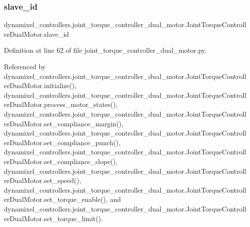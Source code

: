 \subsubsection{\texorpdfstring{slave\+\_\+id}{slave\_id}}
{\footnotesize\ttfamily dynamixel\+\_\+controllers.\+joint\+\_\+torque\+\_\+controller\+\_\+dual\+\_\+motor.\+Joint\+Torque\+Controller\+Dual\+Motor.\+slave\+\_\+id}



Definition at line 62 of file joint\+\_\+torque\+\_\+controller\+\_\+dual\+\_\+motor.\+py.



Referenced by dynamixel\+\_\+controllers.\+joint\+\_\+torque\+\_\+controller\+\_\+dual\+\_\+motor.\+Joint\+Torque\+Controller\+Dual\+Motor.\+initialize(), dynamixel\+\_\+controllers.\+joint\+\_\+torque\+\_\+controller\+\_\+dual\+\_\+motor.\+Joint\+Torque\+Controller\+Dual\+Motor.\+process\+\_\+motor\+\_\+states(), dynamixel\+\_\+controllers.\+joint\+\_\+torque\+\_\+controller\+\_\+dual\+\_\+motor.\+Joint\+Torque\+Controller\+Dual\+Motor.\+set\+\_\+compliance\+\_\+margin(), dynamixel\+\_\+controllers.\+joint\+\_\+torque\+\_\+controller\+\_\+dual\+\_\+motor.\+Joint\+Torque\+Controller\+Dual\+Motor.\+set\+\_\+compliance\+\_\+punch(), dynamixel\+\_\+controllers.\+joint\+\_\+torque\+\_\+controller\+\_\+dual\+\_\+motor.\+Joint\+Torque\+Controller\+Dual\+Motor.\+set\+\_\+compliance\+\_\+slope(), dynamixel\+\_\+controllers.\+joint\+\_\+torque\+\_\+controller\+\_\+dual\+\_\+motor.\+Joint\+Torque\+Controller\+Dual\+Motor.\+set\+\_\+speed(), dynamixel\+\_\+controllers.\+joint\+\_\+torque\+\_\+controller\+\_\+dual\+\_\+motor.\+Joint\+Torque\+Controller\+Dual\+Motor.\+set\+\_\+torque\+\_\+enable(), and dynamixel\+\_\+controllers.\+joint\+\_\+torque\+\_\+controller\+\_\+dual\+\_\+motor.\+Joint\+Torque\+Controller\+Dual\+Motor.\+set\+\_\+torque\+\_\+limit().

\mbox{\label{classdynamixel__controllers_1_1joint__controller_1_1_joint_controller_ad08c30ce31dec43a50d834d45c1d669e}} 
